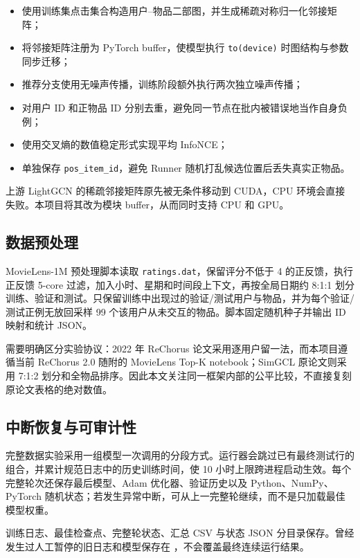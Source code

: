 \documentclass[UTF8,a4paper,12pt]{ctexart}
\begin{document}
\begin{itemize}
  \item 使用训练集点击集合构造用户--物品二部图，并生成稀疏对称归一化邻接矩阵；
  \item 将邻接矩阵注册为 PyTorch buffer，使模型执行 \texttt{to(device)} 时图结构与参数同步迁移；
  \item 推荐分支使用无噪声传播，训练阶段额外执行两次独立噪声传播；
  \item 对用户 ID 和正物品 ID 分别去重，避免同一节点在批内被错误地当作自身负例；
  \item 使用交叉熵的数值稳定形式实现平均 InfoNCE；
  \item 单独保存 \texttt{pos\_item\_id}，避免 Runner 随机打乱候选位置后丢失真实正物品。
\end{itemize}

上游 LightGCN 的稀疏邻接矩阵原先被无条件移动到 CUDA，CPU 环境会直接失败。本项目将其改为模块 buffer，从而同时支持 CPU 和 GPU。

\subsection{数据预处理}

MovieLens-1M 预处理脚本读取 \texttt{ratings.dat}，保留评分不低于 4 的正反馈，执行正反馈 5-core 过滤，加入小时、星期和时间段上下文，再按全局日期约 8:1:1 划分训练、验证和测试。只保留训练中出现过的验证/测试用户与物品，并为每个验证/测试正例无放回采样 99 个该用户从未交互的物品。脚本固定随机种子并输出 ID 映射和统计 JSON。

需要明确区分实验协议：2022 年 ReChorus 论文采用逐用户留一法，而本项目遵循当前 ReChorus 2.0 随附的 MovieLens Top-K notebook；SimGCL 原论文则采用 7:1:2 划分和全物品排序。因此本文关注同一框架内部的公平比较，不直接复刻原论文表格的绝对数值。

\subsection{中断恢复与可审计性}

完整数据实验采用一组模型一次调用的分段方式。运行器会跳过已有最终测试行的组合，并累计规范日志中的历史训练时间，使 10 小时上限跨进程启动生效。每个完整轮次还保存最后模型、Adam 优化器、验证历史以及 Python、NumPy、PyTorch 随机状态；若发生异常中断，可从上一完整轮继续，而不是只加载最佳模型权重。

训练日志、最佳检查点、完整轮状态、汇总 CSV 与状态 JSON 分目录保存。曾经发生过人工暂停的旧日志和模型保存在 ，不会覆盖最终连续运行结果。
\end{document}

